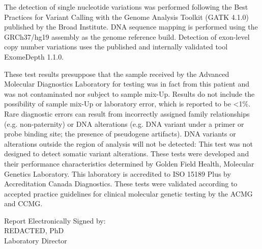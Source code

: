 \documentclass[10pt]{extarticle}
\begin{document}
The detection of single nucleotide variations was performed following the Best Practices for Variant Calling with the Genome Analysis Toolkit (GATK 4.1.0) published by the Broad Institute. DNA sequence mapping is performed using the GRCh37/hg19 assembly as the genome reference build. Detection of exon-level copy number variations uses the published and internally validated tool ExomeDepth 1.1.0.

These test results presuppose that the sample received by the Advanced Molecular Diagnostics Laboratory for testing was in fact from this patient and was not contaminated nor subject to sample mix-Up. Results do not include the possibility of sample mix-Up or laboratory error, which is reported to be <1\%. Rare diagnostic errors can result from incorrectly assigned family relationships (e.g. non-paternity) or DNA alterations (e.g. DNA variant under a primer or probe binding site; the presence of pseudogene artifacts). DNA variants or alterations outside the region of analysis will not be detected: This test was not designed to detect somatic variant alterations. These tests were developed and their performance characteristics determined by Golden Field Health, Molecular Genetics Laboratory. This laboratory is accredited to ISO 15189 Plus by Accreditation Canada Diagnostics. These tests were validated according to accepted practice guidelines for clinical molecular genetic testing by the ACMG and CCMG.

\vspace{2em}
\hfill \parbox{10cm}{
Report Electronically Signed by: \\
REDACTED, PhD \\
Laboratory Director
}
\end{document}
